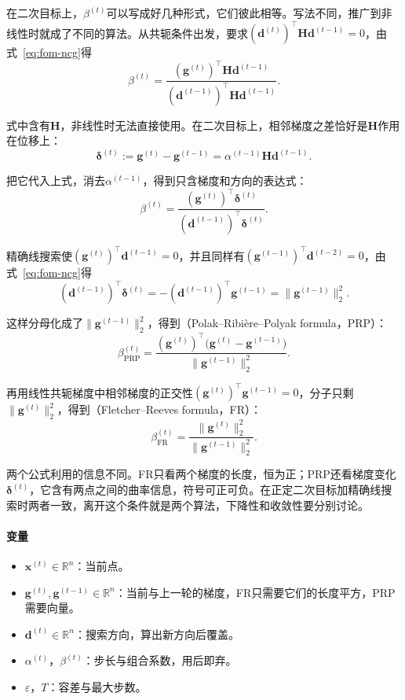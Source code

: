 在二次目标上，$\beta^{(t)}$可以写成好几种形式，它们彼此相等。写法不同，推广到非线性时就成了不同的算法。从共轭条件出发，要求$(\bm{d}^{(t)})^\top\bm{H}\bm{d}^{(t-1)}=0$，由式~\eqref{eq:fom-ncg}得
\[
 \beta^{(t)}=\frac{(\bm{g}^{(t)})^\top\bm{H}\bm{d}^{(t-1)}}{(\bm{d}^{(t-1)})^\top\bm{H}\bm{d}^{(t-1)}}.
\]

式中含有$\bm{H}$，非线性时无法直接使用。在二次目标上，相邻梯度之差恰好是$\bm{H}$作用在位移上：
\[
 \bm{\delta}^{(t)}:=\bm{g}^{(t)}-\bm{g}^{(t-1)}=\alpha^{(t-1)}\bm{H}\bm{d}^{(t-1)}.
\]

把它代入上式，消去$\alpha^{(t-1)}$，得到只含梯度和方向的表达式：
\[
 \beta^{(t)}=\frac{(\bm{g}^{(t)})^\top\bm{\delta}^{(t)}}{(\bm{d}^{(t-1)})^\top\bm{\delta}^{(t)}}.
\]

精确线搜索使$(\bm{g}^{(t)})^\top\bm{d}^{(t-1)}=0$，并且同样有$(\bm{g}^{(t-1)})^\top\bm{d}^{(t-2)}=0$，由式~\eqref{eq:fom-ncg}得
\[
 (\bm{d}^{(t-1)})^\top\bm{\delta}^{(t)}=-(\bm{d}^{(t-1)})^\top\bm{g}^{(t-1)}=\lVert\bm{g}^{(t-1)}\rVert_2^2.
\]

这样分母化成了$\lVert\bm{g}^{(t-1)}\rVert_2^2$，得到（Polak--Ribière--Polyak formula，PRP）：
\begin{equation}
 \beta_{\mathrm{PRP}}^{(t)}=\frac{(\bm{g}^{(t)})^\top\bigl(\bm{g}^{(t)}-\bm{g}^{(t-1)}\bigr)}{\lVert\bm{g}^{(t-1)}\rVert_2^2}.
 \label{eq:fom-beta-prp}
\end{equation}

再用线性共轭梯度中相邻梯度的正交性$(\bm{g}^{(t)})^\top\bm{g}^{(t-1)}=0$，分子只剩$\lVert\bm{g}^{(t)}\rVert_2^2$，得到（Fletcher--Reeves formula，FR）：
\begin{equation}
 \beta_{\mathrm{FR}}^{(t)}=\frac{\lVert\bm{g}^{(t)}\rVert_2^2}{\lVert\bm{g}^{(t-1)}\rVert_2^2}.
 \label{eq:fom-beta-fr}
\end{equation}

两个公式利用的信息不同。FR只看两个梯度的长度，恒为正；PRP还看梯度变化$\bm{\delta}^{(t)}$，它含有两点之间的曲率信息，符号可正可负。在正定二次目标加精确线搜索时两者一致，离开这个条件就是两个算法，下降性和收敛性要分别讨论。

\paragraph{变量}
\begin{itemize}
 \item $\bm{x}^{(t)}\in\mathbb{R}^n$：当前点。
 \item $\bm{g}^{(t)},\bm{g}^{(t-1)}\in\mathbb{R}^n$：当前与上一轮的梯度，FR只需要它们的长度平方，PRP需要向量。
 \item $\bm{d}^{(t)}\in\mathbb{R}^n$：搜索方向，算出新方向后覆盖。
 \item $\alpha^{(t)}$，$\beta^{(t)}$：步长与组合系数，用后即弃。
 \item $\varepsilon$，$T$：容差与最大步数。
\end{itemize}


